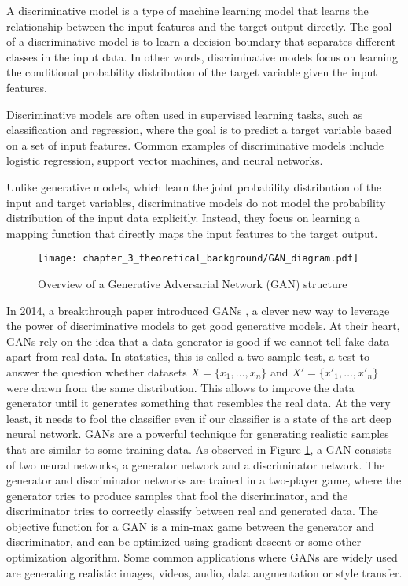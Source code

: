 A discriminative model is a type of machine learning model that learns the relationship between the input features and the target output directly. The goal of a discriminative model is to learn a decision boundary that separates different classes in the input data. In other words, discriminative models focus on learning the conditional probability distribution of the target variable given the input features.

Discriminative models are often used in supervised learning tasks, such as classification and regression, where the goal is to predict a target variable based on a set of input features. Common examples of discriminative models include logistic regression, support vector machines, and neural networks.

Unlike generative models, which learn the joint probability distribution of the input and target variables, discriminative models do not model the probability distribution of the input data explicitly. Instead, they focus on learning a mapping function that directly maps the input features to the target output.

\begin{figure}[h]
	\centering
	\texttt{[image: chapter\_3\_theoretical\_background/GAN\_diagram.pdf]}
	\caption{Overview of a Generative Adversarial Network (GAN) structure}
	\label{fig:chapter_3_theoretical_background/GAN}
\end{figure}

In 2014, a breakthrough paper introduced \acfp{GAN} \cite{goodfellow2020generative}, a clever new way to leverage the power of discriminative models to get good generative models. At their heart, \acp{GAN} rely on the idea that a data generator is good if we cannot tell fake data apart from real data. In statistics, this is called a two-sample test, a test to answer the question whether datasets $X=\{x_1,\ldots, x_n\}$ and $X'=\{x'_1,\ldots, x'_n\}$ were drawn from the same distribution. This allows to improve the data generator until it generates something that resembles the real data. At the very least, it needs to fool the classifier even if our classifier is a state of the art deep neural network. \acp{GAN} are a powerful technique for generating realistic samples that are similar to some training data. As observed in Figure \ref{fig:chapter_3_theoretical_background/GAN}, a \ac{GAN} consists of two neural networks, a generator network and a discriminator network. The generator and discriminator networks are trained in a two-player game, where the generator tries to produce samples that fool the discriminator, and the discriminator tries to correctly classify between real and generated data. The objective function for a \ac{GAN} is a min-max game between the generator and discriminator, and can be optimized using gradient descent or some other optimization algorithm. Some common applications where \acp{GAN} are widely used are generating realistic images, videos, audio, data augmentation or style transfer.

